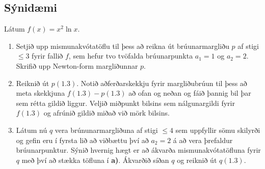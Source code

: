 \documentclass[A4paper,10pt,icelandic]{sphinxmanual}
\begin{document}
\subsection{Sýnidæmi}
\label{kafli03:id10}
Látum \(f(x)=x^2\ln x\).
\begin{enumerate}
\item {} 
Setjið upp mismunakvótatöflu til þess að reikna út brúunarmargliðu
\(p\) af stigi \(\leq 3\) fyrir fallið \(f\), sem hefur tvo
tvöfalda brúunarpunkta \(a_1=1\) og \(a_2=2\). Skrifið upp
Newton-form margliðunnar \(p\).

\item {} 
Reiknið út \(p(1.3)\). Notið aðferðarskekkju fyrir margliðubrúun
til þess að meta skekkjuna \(f(1.3)-p(1.3)\) að ofan og neðan og
fáið þannig bil þar sem rétta gildið liggur. Veljið miðpunkt bilsins sem
nálgunargildi fyrir \(f(1.3)\) og afrúnið gildið miðað við mörk
bilsins.

\item {} 
Látum nú \(q\) vera brúnunarmargliðuna af stigi \(\leq 4\) sem
uppfyllir sömu skilyrði og gefin eru í fyrsta lið að viðbættu því að
\(a_2=2\) á að vera þrefaldur brúunarpunktur. Sýnið hvernig hægt er
að ákvarða mismunakvótatöfluna fyrir \(q\) með því að stækka töfluna
í \textbf{a)}. Ákvarðið síðan \(q\) og reiknið út \(q(1.3)\).

\end{enumerate}
\end{document}
